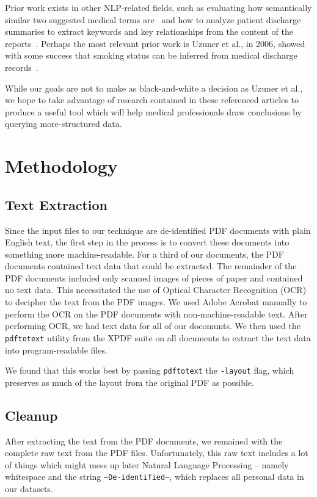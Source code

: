 \documentclass{acm_proc_article-sp}
\begin{document}
Prior work exists in other NLP-related fields, such as evaluating how semantically similar 
two suggested medical terms are~\cite{Pedersen2007288} and how to analyze patient
discharge summaries to extract keywords and key relationships from the content of the
reports~\cite{soderland}. Perhaps the most relevant prior work is Uzuner et al., in 2006,
showed with some success that smoking status can be inferred from medical discharge 
records~\cite{Uzuner200814}.

While our goals are not to make as black-and-white a decision as Uzuner et al., we hope to take 
advantage of research contained in these referenced articles to produce a useful tool which will
help medical professionals draw conclusions by querying more-structured data.

\section{Methodology}
\subsection{Text Extraction}
Since the input files to our technique are de-identified PDF documents with plain English text, the first step
in the process is to convert these documents into something more machine-readable. For a third of our documents,
the PDF documents contained text data that could be extracted. The remainder of the PDF documents included only
scanned images of pieces of paper and contained no text data. This necessitated the use
of Optical Character Recognition (OCR) to decipher the text from the PDF images. We used Adobe Acrobat manually
to perform the OCR on the PDF documents with non-machine-readable text.
After performing OCR, we had text data for all of our docomunts. We then used the \texttt{pdftotext} utility 
from the XPDF suite \cite{xpdf} on all documents to extract the text data into program-readable files.

We found that this works best by passing \texttt{pdftotext} the \texttt{-layout} flag, which preserves as much
of the layout from the original PDF as possible.

\subsection{Cleanup}
After extracting the text from the PDF documents, we remained with the complete raw text from the PDF files.
Unfortunately, this raw text includes a lot of things which might mess up later Natural Language Processing --
namely whitespace and the string \texttt{--De-identified--}, which replaces all personal data in our datasets.
\end{document}
